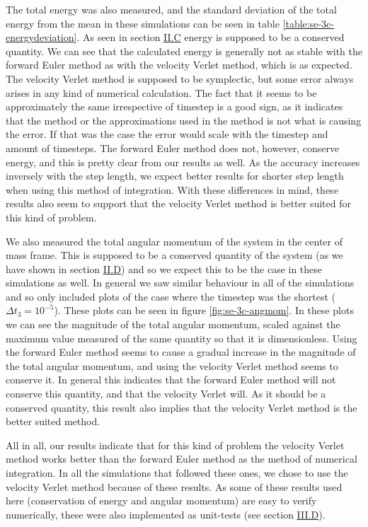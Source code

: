 \documentclass[reprint,english,notitlepage]{revtex4-1}  %
\begin{document}
The total energy was also measured, and the standard deviation of the total energy from the mean in these simulations can be seen in table \ref{table:se-3c-energydeviation}. As seen in section \hyperref[sec:II:c]{II.C} energy is supposed to be a conserved quantity. We can see that the calculated energy is generally not as stable with the forward Euler method as with the velocity Verlet method, which is as expected. The velocity Verlet method is supposed to be symplectic, but some error always arises in any kind of numerical calculation. The fact that it seems to be approximately the same irrespective of timestep is a good sign, as it indicates that the method or the approximations used in the method is not what is causing the error. If that was the case the error would scale with the timestep and amount of timesteps. The forward Euler method does not, however, conserve energy, and this is pretty clear from our results as well. As the accuracy increases inversely with the step length, we expect better results for shorter step length when using this method of integration. With these differences in mind, these results also seem to support that the velocity Verlet method is better suited for this kind of problem.

We also measured the total angular momentum of the system in the center of mass frame. This is supposed to be a conserved quantity of the system (as we have shown in section \hyperref[sec:II:d]{II.D}) and so we expect this to be the case in these simulations as well. In general we saw similar behaviour in all of the simulations and so only included plots of the case where the timestep was the shortest ($\Delta t_3 = 10^{-5}$). These plots can be seen in figure \ref{fig:se-3c-angmom}. In these plots we can see the magnitude of the total angular momentum, scaled against the maximum value measured of the same quantity so that it is dimensionless. Using the forward Euler method seems to cause a gradual increase in the magnitude of the total angular momentum, and using the velocity Verlet method seems to conserve it. In general this indicates that the forward Euler method will not conserve this quantity, and that the velocity Verlet will. As it should be a conserved quantity, this result also implies that the velocity Verlet method is the better suited method.

All in all, our results indicate that for this kind of problem the velocity Verlet method works better than the forward Euler method as the method of numerical integration. In all the simulations that followed these ones, we chose to use the velocity Verlet method because of these results. As some of these results used here (conservation of energy and angular momentum) are easy to verify numerically, these were also implemented as unit-tests (see section \hyperref[sec:III:d]{III.D}).
\end{document}
